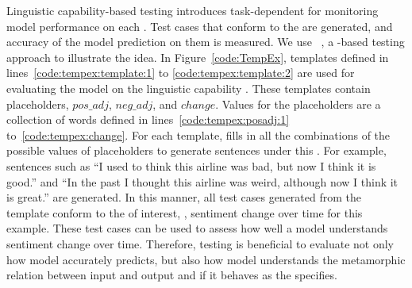 Linguistic capability-based testing introduces task-dependent \lcs for monitoring model performance on each \lc \cite{marcoACL2020checklist, searleman1977review}. 
Test cases that conform to the \lc are generated, and accuracy of the model prediction on them is measured. 
We use \Cklst~\cite{marcoACL2020checklist}, a \sota \lc-based testing approach to illustrate the idea.
In Figure~\ref{code:TempEx}, templates defined
in lines~\ref{code:tempex:template:1} to \ref{code:tempex:template:2} are used for evaluating the \sa model on the linguistic capability \SareqExThree. These templates contain placeholders, ${pos\_adj}$, ${neg\_adj}$, and ${change}$. Values for the placeholders are a collection of words defined in lines~\ref{code:tempex:posadj:1} to~\ref{code:tempex:change}.
For each template, \Cklst fills in all the combinations of the
possible values of placeholders to generate sentences under this \lc.
For example, sentences such as ``I used to think this airline was bad, but now I think it is good.'' and ``In the past I thought this airline was weird, although now I think it is great.'' are generated. 
In this manner, all test cases generated from the template conform to the \lc
of interest, \ie, sentiment change over time for this example. These test cases can be used to assess how well a \sa model 
understands sentiment change over time.
Therefore, \lc testing is beneficial to evaluate not only how model accurately predicts, 
but also how model understands the metamorphic relation between input and output and if it behaves 
as the \lc specifies.

